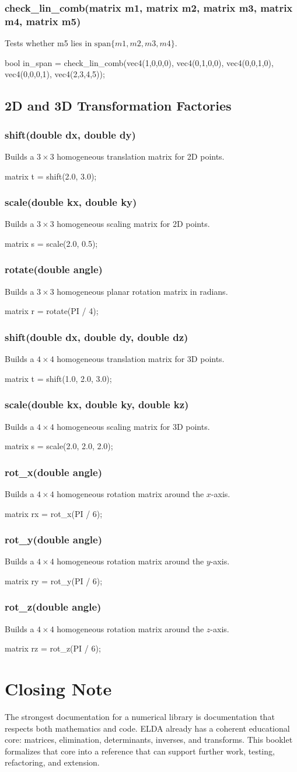 \documentclass[11pt,a4paper,openany]{book}
\def\code#1{#1}%
\DeclareRobustCommand{\code}[1]{\texttt{\detokenize{#1}}}
\newcommand{\FunctionCard}[3]{
    \subsection{\code{#1}}
    #2
    \begin{examplebox}[Example]
    \code{#3}
    \end{examplebox}
}
\begin{document}
\FunctionCard{check\_lin\_comb(matrix m1, matrix m2, matrix m3, matrix m4, matrix m5)}{Tests whether \code{m5} lies in \(\text{span}\{m1,m2,m3,m4\}\).}{
bool in_span = check_lin_comb(vec4(1,0,0,0), vec4(0,1,0,0), vec4(0,0,1,0), vec4(0,0,0,1), vec4(2,3,4,5));
}

\section{2D and 3D Transformation Factories}

\FunctionCard{shift(double dx, double dy)}{Builds a \(3 \times 3\) homogeneous translation matrix for 2D points.}{
matrix t = shift(2.0, 3.0);
}

\FunctionCard{scale(double kx, double ky)}{Builds a \(3 \times 3\) homogeneous scaling matrix for 2D points.}{
matrix s = scale(2.0, 0.5);
}

\FunctionCard{rotate(double angle)}{Builds a \(3 \times 3\) homogeneous planar rotation matrix in radians.}{
matrix r = rotate(PI / 4);
}

\FunctionCard{shift(double dx, double dy, double dz)}{Builds a \(4 \times 4\) homogeneous translation matrix for 3D points.}{
matrix t = shift(1.0, 2.0, 3.0);
}

\FunctionCard{scale(double kx, double ky, double kz)}{Builds a \(4 \times 4\) homogeneous scaling matrix for 3D points.}{
matrix s = scale(2.0, 2.0, 2.0);
}

\FunctionCard{rot\_x(double angle)}{Builds a \(4 \times 4\) homogeneous rotation matrix around the \(x\)-axis.}{
matrix rx = rot_x(PI / 6);
}

\FunctionCard{rot\_y(double angle)}{Builds a \(4 \times 4\) homogeneous rotation matrix around the \(y\)-axis.}{
matrix ry = rot_y(PI / 6);
}

\FunctionCard{rot\_z(double angle)}{Builds a \(4 \times 4\) homogeneous rotation matrix around the \(z\)-axis.}{
matrix rz = rot_z(PI / 6);
}

\backmatter

\chapter*{Closing Note}
The strongest documentation for a numerical library is documentation that respects both mathematics and code. ELDA already has a coherent educational core: matrices, elimination, determinants, inverses, and transforms. This booklet formalizes that core into a reference that can support further work, testing, refactoring, and extension.
\end{document}
